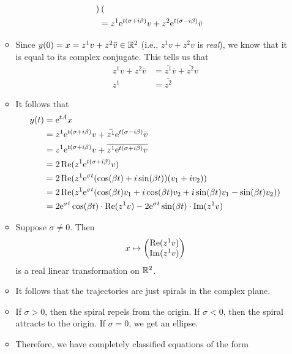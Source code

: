\documentclass[../notes.tex]{subfiles}
\begin{document}
\begin{itemize}
\begin{itemize}
\begin{align*}
\begin{pmatrix}
            \end{pmatrix}\\
            &= z^1\e[t(\sigma+i\beta)]v+z^2\e[t(\sigma-i\beta)]\bar{v}
        \end{align*}
        \item Since $y(0)=x=z^1v+z^2\bar{v}\in\R^2$ (i.e., $z^1v+z^2v$ is \emph{real}), we know that it is equal to its complex conjugate. This tells us that
        \begin{align*}
            z^1v+z^2\bar{v} &= \bar{z^1}\bar{v}+\bar{z^2}v\\
            z^1 &= \bar{z^2}
        \end{align*}
        \item It follows that
        \begin{align*}
            y(t) &= \e[tA]x\\
            &= z^1\e[t(\sigma+i\beta)]v+\bar{z^1}\e[t(\sigma-i\beta)]\bar{v}\\
            &= z^1\e[t(\sigma+i\beta)]v+\overline{z^1\e[t(\sigma+i\beta)]v}\\
            &= 2\Ree(z^1\e[t(\sigma+i\beta)]v)\\
            &= 2\Ree(z^1\e[\sigma t](\cos(\beta t)+i\sin(\beta t))(v_1+iv_2))\\
            &= 2\Ree(z^1\e[\sigma t](\cos(\beta t)v_1+i\cos(\beta t)v_2+i\sin(\beta t)v_1-\sin(\beta t)v_2))\\
            &= 2\e[\sigma t]\cos(\beta t)\cdot\Ree(z^1v)-2\e[\sigma t]\sin(\beta t)\cdot\Imm(z^1v)
        \end{align*}
        \item Suppose $\sigma\neq 0$. Then
        \begin{equation*}
            x \mapsto
            \begin{pmatrix}
                \Ree(z^1v)\\
                \Imm(z^1v)\\
            \end{pmatrix}
        \end{equation*}
        is a real linear transformation on $\R^2$.
        \item It follows that the trajectories are just spirals in the complex plane.
        \item If $\sigma>0$, then the spiral repels from the origin. If $\sigma<0$, then the spiral attracts to the origin. If $\sigma=0$, we get an ellipse.
        \item Therefore, we have completely classified equations of the form

\end{itemize}
\end{itemize}
\end{document}

